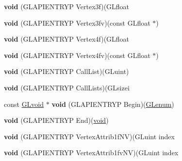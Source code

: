 \begin{DoxyCompactItemize}
{\bfseries void} (G\+L\+A\+P\+I\+E\+N\+T\+R\+YP Vertex3f)(G\+Lfloat
\item 
\mbox{\label{struct_g_lvertexformat_a8d16ff7c57857a9febe1c1ea7e63f085}} 
{\bfseries void} (G\+L\+A\+P\+I\+E\+N\+T\+R\+YP Vertex3fv)(const G\+Lfloat $\ast$)
\item 
\mbox{\label{struct_g_lvertexformat_a52e57cbd5161e32b5612f76322fad48b}} 
{\bfseries void} (G\+L\+A\+P\+I\+E\+N\+T\+R\+YP Vertex4f)(G\+Lfloat
\item 
\mbox{\label{struct_g_lvertexformat_aede12ce34168fe78c216dad2a29ebabf}} 
{\bfseries void} (G\+L\+A\+P\+I\+E\+N\+T\+R\+YP Vertex4fv)(const G\+Lfloat $\ast$)
\item 
\mbox{\label{struct_g_lvertexformat_acd6d0052a7d686221a662c422084704a}} 
{\bfseries void} (G\+L\+A\+P\+I\+E\+N\+T\+R\+YP Call\+List)(G\+Luint)
\item 
\mbox{\label{struct_g_lvertexformat_a57a769d44bbe728859d00f71ee53c523}} 
{\bfseries void} (G\+L\+A\+P\+I\+E\+N\+T\+R\+YP Call\+Lists)(G\+Lsizei
\item 
\mbox{\label{struct_g_lvertexformat_ab882ba4810d7319ee4ff8d2e68c9fada}} 
const \hyperlink{interfacevoid}{G\+Lvoid} $\ast$ {\bfseries void} (G\+L\+A\+P\+I\+E\+N\+T\+R\+YP Begin)(\hyperlink{interfacevoid}{G\+Lenum})
\item 
\mbox{\label{struct_g_lvertexformat_a1a888c2ecf340a5075ec4975fcaf327c}} 
{\bfseries void} (G\+L\+A\+P\+I\+E\+N\+T\+R\+YP End)(\hyperlink{interfacevoid}{void})
\item 
\mbox{\label{struct_g_lvertexformat_a24ec03d8573de8370278483ac00d52ce}} 
{\bfseries void} (G\+L\+A\+P\+I\+E\+N\+T\+R\+YP Vertex\+Attrib1f\+NV)(G\+Luint index
\item 
\mbox{\label{struct_g_lvertexformat_aab156b4bcd84acb3284aae71c8b34517}} 
{\bfseries void} (G\+L\+A\+P\+I\+E\+N\+T\+R\+YP Vertex\+Attrib1fv\+NV)(G\+Luint index
\item 
\mbox{\label{struct_g_lvertexformat_a006b9c4665eafc7eabffc15acf2d99b9}} 

\end{DoxyCompactItemize}

